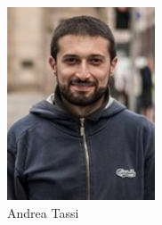 \documentclass[aspectratio=169]{beamer}
\begin{document}
\begin{frame}
\begin{columns}
\begin{column}{0.25\textwidth}
\includegraphics[width=\textwidth]{andrea.jpeg}\\
Andrea Tassi
\end{column}
\end{columns}
\end{frame}
\end{document}

